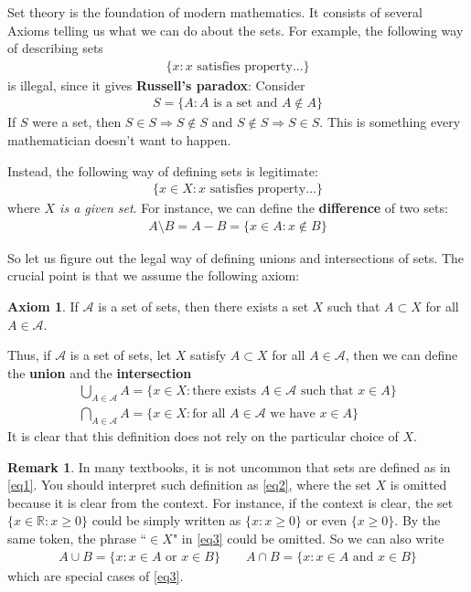 \documentclass[12pt,b5paper,notitlepage]{article}
\theoremstyle{definition}
\newtheorem{rem}[df]{Remark}
\newtheorem*{axiom}{Axiom}
\theoremstyle{plain}
\newcommand{\scr}{\mathscr}
\newcommand{\Rbb}{\mathbb R}
\numberwithin{equation}{section}
\begin{document}
Set theory is the foundation of modern mathematics. It consists of several Axioms telling us what we can do about the sets. For example, the following way of describing sets
\begin{align}
\{x: x\text{ satisfies property...}\}  \label{eq1}
\end{align}
is illegal, since it gives \textbf{Russell's paradox}: Consider
\begin{align}
S=\{A: A\text{ is a set and }A\notin A\}\label{eq12}
\end{align}
If $S$ were a set, then $S\in S\Rightarrow S\notin S$ and $S\notin S\Rightarrow S\in S$. This is something every mathematician doesn't want to happen.

Instead, the following way of defining sets is legitimate:
\begin{align}
\{x\in X:x\text{ satisfies property}\dots\}  \label{eq2}
\end{align}
where \textit{$X$ is a given set}.  For instance, we can define the \textbf{difference} of two sets:
\begin{align*}
A\setminus B=A-B=\{x\in A:x\notin B\}
\end{align*}




So let us figure out the legal way of defining unions and intersections of sets. The crucial point is that we assume the following axiom:
\begin{axiom}
If $\scr A$ is a set of sets, then there exists a set $X$ such that $A\subset X$ for all $A\in\scr A$.
\end{axiom}

Thus, if $\scr A$ is a set of sets, let $X$ satisfy $A\subset X$ for all $A\in\scr A$, then we can define the \textbf{union} and the \textbf{intersection} 
\begin{subequations}\label{eq3}
\begin{gather}
\bigcup_{A\in\scr A}A=\{x\in X:\text{there exists $A\in\scr A$ such that $x\in A$}\}\\
\bigcap_{A\in\scr A}A=\{x\in X:\text{for all $A\in\scr A$ we have $x\in A$}\}
\end{gather}
\end{subequations}
It is clear that this definition does not rely on the particular choice of $X$.

\begin{rem}
In many textbooks, it is not uncommon that sets are defined as in \eqref{eq1}. You should interpret such definition as \eqref{eq2}, where the set $X$ is omitted because it is clear from the context. For instance, if the context is clear, the set $\{x\in\Rbb:x\geq 0\}$ could be simply written as $\{x:x\geq0\}$ or even $\{x\geq0\}$. By the same token, the phrase ``$\in X$" in \eqref{eq3} could be omitted. So we can also write
\begin{gather*}
A\cup B=\{x: x\in A\text{ or }x\in B\} \qquad  A\cap B=\{x: x\in A\text{ and }x\in B\}
\end{gather*}
which are special cases of \eqref{eq3}.
\end{rem}
\end{document}
